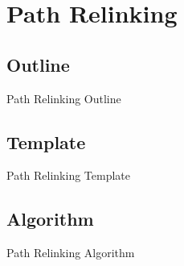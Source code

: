 \section{Path Relinking}

\subsection{Outline}
\begin{frame}[allowframebreaks]{Path Relinking Outline}{}
  
\end{frame}

\subsection{Template}
\begin{frame}[allowframebreaks]{Path Relinking Template}{}
  
\end{frame}

\subsection{Algorithm}
\begin{frame}[allowframebreaks]{Path Relinking Algorithm}{}
  \footnotesize{}
\end{frame}
